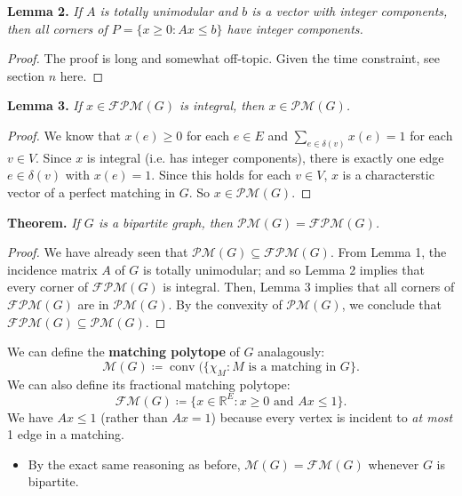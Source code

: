 \begin{frame}
	\textbf{Lemma 2.} \emph{If \( A \) is totally unimodular and \( b \) is a vector with integer components, then all corners of \( P = \{ x \geq 0 : Ax \leq b \}  \) have integer components.}
\begin{proof}
	The proof is long and somewhat off-topic. Given the time constraint, see section \( n \) \alert{here}.
\end{proof}
\end{frame}

\begin{frame}
\textbf{Lemma 3.} \emph{If \( x \in \mathcal{FPM} (G) \) is integral, then \( x \in \mathcal{PM} (G) \).}
\begin{proof}
We know that \( x(e) \geq 0 \) for each \( e \in E \) and \( \sum_{e \in \delta (v)}^{} x(e) = 1 \) for each \( v \in V \). Since \( x \) is integral (i.e. has integer components), there is exactly one edge \( e \in \delta (v) \) with \( x(e) = 1 \). Since this holds for each \( v \in V \), \( x \) is a characterstic vector of a perfect matching in \( G \). So \( x \in \mathcal{PM} (G) \).
\end{proof}
\end{frame}

\begin{frame}
	\textbf{Theorem.} \emph{If \( G \) is a bipartite graph, then \( \mathcal{PM} (G) = \mathcal{FPM} (G) \).}
\begin{proof}
We have already seen that \( \mathcal{PM} (G) \subseteq \mathcal{FPM} (G) \). From Lemma 1, the incidence matrix \( A \) of \( G \) is totally unimodular; and so Lemma 2 implies that every corner of \( \mathcal{FPM} (G) \) is integral. Then, Lemma 3 implies that all corners of \( \mathcal{FPM} (G) \) are in \( \mathcal{PM} (G) \). By the convexity of \( \mathcal{PM} (G) \), we conclude that \( \mathcal{FPM} (G) \subseteq \mathcal{PM} (G) \).
\end{proof}
\end{frame}

\begin{frame}
We can define the \textbf{matching polytope} of \( G \) analagously: \[ \mathcal{M} (G) \coloneqq \operatorname{conv} (\{ \chi_{M} : M \mbox{ is a matching in } G \} . \] We can also define its fractional matching polytope: \[ \mathcal{FM} (G) \coloneqq \{ x \in \mathbb{R}^{E} : x \geq 0 \mbox{ and } Ax \leq 1 \}. \]
We have \( Ax \leq 1 \) (rather than \( Ax = 1 \)) because every vertex is incident to \emph{at most} 1 edge in a matching.
\begin{itemize}
	\item<2> By the exact same reasoning as before, \( \mathcal{M} (G) = \mathcal{FM} (G) \) whenever \( G \) is bipartite.
	
\end{itemize}
\end{frame}

